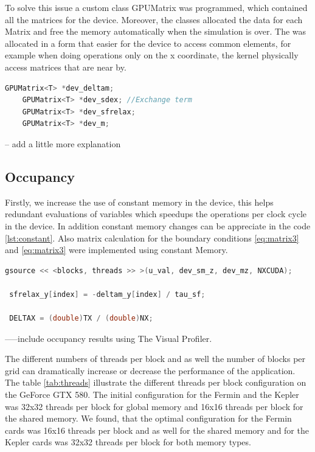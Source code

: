 To solve this issue a custom class GPUMatrix was programmed, which contained all the matrices for the device. Moreover, the classes allocated the data for each Matrix and free the memory automatically when the simulation is over. The was allocated in a form that easier for the device to access common elements, for example when doing operations only on the x coordinate, the kernel physically access matrices that are near by.

\begin{lstlisting}[language=C++, caption={SOA implementation}]
    GPUMatrix<T> *dev_deltam;
    GPUMatrix<T> *dev_sdex; //Exchange term
    GPUMatrix<T> *dev_sfrelax;
    GPUMatrix<T> *dev_m; 
\end{lstlisting}

-- add a little more explanation

\subsection{Occupancy}
 
Firstly, we increase the use of constant memory in the device, this helps redundant evaluations of variables which speedups the operations per clock cycle in the device. In addition  constant memory changes can be appreciate in the code \ref{lst:constant}. Also  matrix calculation for the boundary conditions \ref{eq:matrix3} and \ref{eq:matrix3} were implemented using constant Memory.
 
 \begin{lstlisting}[language=C++,  label={lst:constant}, caption={Constant Memory changes}]
 gsource << <blocks, threads >> >(u_val, dev_sm_z, dev_mz, NXCUDA);
 
 sfrelax_y[index] = -deltam_y[index] / tau_sf;
     
 DELTAX = (double)TX / (double)NX;
\end{lstlisting}


-----include occupancy results using The Visual Profiler.
 
The different numbers of threads per block and as well the number of blocks per grid can dramatically increase or decrease the performance of the application. The table \ref{tab:threads} illustrate the different threads per block configuration on the GeForce GTX 580. The initial configuration for the Fermin and the Kepler was 32x32 threads per block for global memory and 16x16 threads per block for the shared memory. We found, that the optimal configuration for the Fermin cards was 16x16 threads per block and as well for the shared memory and for the Kepler cards was 32x32 threads per block for both memory types.

